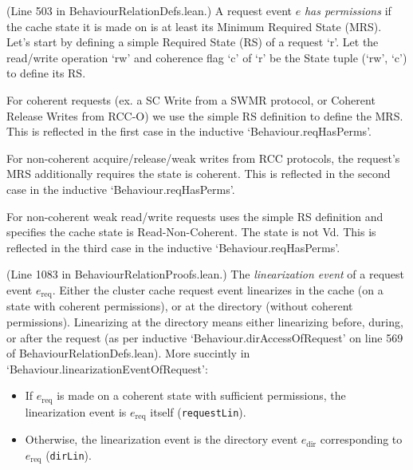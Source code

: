 \begin{definition}
  \label{def:reqHasPerms}
  \leanok
  (Line 503 in BehaviourRelationDefs.lean.)
  A request event $e$ \emph{has permissions} if the cache state it is made on
  is at least its Minimum Required State (MRS).
  Let's start by defining a simple Required State (RS) of a request `r'.
  Let the read/write operation `rw' and coherence flag `c' of `r' be the State tuple (`rw', `c')
  to define its RS.

  For coherent requests (ex. a SC Write from a SWMR protocol, or Coherent Release Writes from RCC-O)
  we use the simple RS definition to define the MRS.
  This is reflected in the first case in the inductive `Behaviour.reqHasPerms'.

  For non-coherent acquire/release/weak writes from RCC protocols, the request's MRS
  additionally requires the state is coherent.
  This is reflected in the second case in the inductive `Behaviour.reqHasPerms'.

  For non-coherent weak read/write requests uses the simple RS definition and specifies
  the cache state is Read-Non-Coherent. The state is not Vd.
  This is reflected in the third case in the inductive `Behaviour.reqHasPerms'.
\end{definition}

\begin{definition}
  \label{def:linearizationEventOfRequest}
  \leanok
  (Line 1083 in BehaviourRelationProofs.lean.)
  The \emph{linearization event} of a request event $e_{\mathrm{req}}$.
  Either the cluster cache request event linearizes in the cache (on a state with coherent permissions),
  or at the directory (without coherent permissions). Linearizing at the directory means
  either linearizing before, during, or after the request (as per inductive `Behaviour.dirAccessOfRequest'
  on line 569 of BehaviourRelationDefs.lean). More succintly in `Behaviour.linearizationEventOfRequest':
  \begin{itemize}
    \item If $e_{\mathrm{req}}$ is made on a coherent state with sufficient permissions,
      the linearization event is $e_{\mathrm{req}}$ itself (\texttt{requestLin}).
    \item Otherwise, the linearization event is the directory event $e_{\mathrm{dir}}$
      corresponding to $e_{\mathrm{req}}$ (\texttt{dirLin}).
  \end{itemize}
\end{definition}

